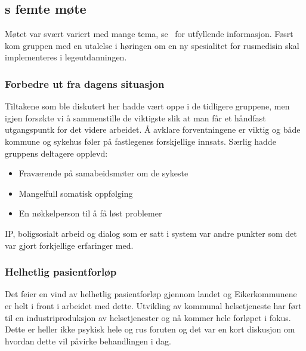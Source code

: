 \documentclass[11pt]{report} %
\begin{document}
                  \subsection{s femte møte}\label{sec:agr_5}
                    Møtet var svært variert med mange tema, se~\cite{arbgr_mref-5} for utfyllende informasjon. Føsrt kom gruppen med en utalelse i høringen om en ny spesialitet for rusmedisin skal implementeres i legeutdanningen.\\
                    \subsubsection{Forbedre ut fra dagens situasjon}
                      Tiltakene som ble diskutert her hadde vært oppe i de tidligere gruppene, men igjen forsøkte vi å sammenstille de viktigste slik at man får et håndfast utgangspuntk for det videre arbeidet. Å avklare forventningene er viktig og både kommune og sykehus føler på fastlegenes forskjellige innsats. Særlig hadde gruppens deltagere opplevd:\\
                        \begin{itemize}
                          \item Fraværende på samabeidsmøter om de sykeste\\
                          \item Mangelfull somatisk oppfølging\\
                          \item En nøkkelperson til å få løst problemer\\
                        \end{itemize}
                      IP, boligsosialt arbeid og dialog som er satt i system var andre punkter som det var gjort forkjellige erfaringer med. 
                    \subsubsection{Helhetlig pasientforløp}
                     Det feier en vind av helhetlig pasientforløp gjennom landet og Eikerkommunene er helt i front i arbeidet med dette. Utvikling av kommunal helsetjeneste har ført til en industriproduksjon av helsetjenester og nå kommer hele forløpet i fokus. Dette er heller ikke psykisk hele og rus foruten og det var en kort diskusjon om hvordan dette vil påvirke behandlingen i dag. 
\end{document}
